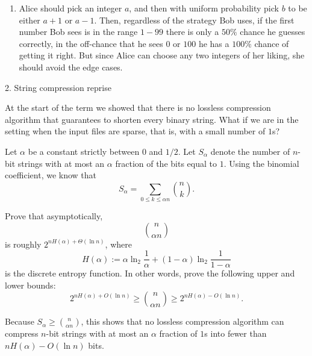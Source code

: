 \documentclass[12pt]{article}
\begin{document}
\begin{solution}
\begin{enumerate}
        \item Alice should pick an integer $a$, and then with uniform probability pick $b$ to be either $a+1$ or $a-1$. Then, regardless of the strategy Bob uses, if the first number Bob sees is in the range $1-99$ there is only a $50\%$ chance he guesses correctly, in the off-chance that he sees $0$ or $100$ he has a $100\%$ chance of getting it right. But since Alice can choose any two integers of her liking, she should avoid the edge cases. 
    \end{enumerate}
\end{solution}

\newpage
\begin{problem}{2. String compression reprise}
        
    At the start of the term we showed that there is no lossless compression algorithm that guarantees to shorten every binary string. What if we are in the setting when the input files are sparse, that is, with a small number of \(1\)s?

    Let \(\alpha\) be a constant strictly between \(0\) and \(1/2\). Let \(S_\alpha\) denote the number of \(n\)-bit strings with at most an \(\alpha\) fraction of the bits equal to \(1\). Using the binomial coefficient, we know that
    \[
    S_\alpha = \sum_{0 \le k \le \alpha n} \binom{n}{k}.
    \]

    Prove that asymptotically,
    \[
    \binom{n}{\alpha n}
    \]
    is roughly \(2^{nH(\alpha) + \Theta(\ln n)}\), where
    \[
    H(\alpha) := \alpha \ln_2 \frac{1}{\alpha} + (1-\alpha)\ln_2 \frac{1}{1-\alpha}
    \]
    is the discrete entropy function. In other words, prove the following upper and lower bounds:
    \[
    2^{nH(\alpha) + O(\ln n)} \ge \binom{n}{\alpha n} \ge 2^{nH(\alpha) - O(\ln n)}.
    \]

    Because \(S_\alpha \ge \binom{n}{\alpha n}\), this shows that no lossless compression algorithm can compress \(n\)-bit strings with at most an \(\alpha\) fraction of \(1\)s into fewer than \(nH(\alpha) - O(\ln n)\) bits.
\end{problem}
\end{document}
